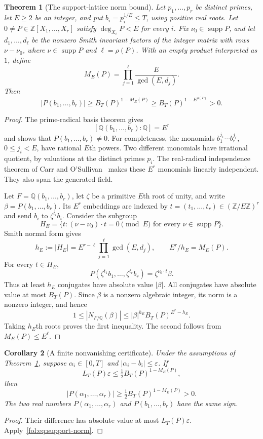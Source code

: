 \documentclass[11pt,a4paper]{article}
\newtheorem{theorem}{Theorem}[section]
\newtheorem{corollary}[theorem]{Corollary}
\theoremstyle{definition}
\theoremstyle{remark}
\numberwithin{equation}{section}
\begin{document}
\begin{theorem}[The support-lattice norm bound]
\label{fol:thm:support-norm}
Let $p_1,\ldots,p_r$ be distinct primes, let $E\ge2$ be an integer, and
put $b_i=p_i^{1/E}\le T$, using positive real roots. Let
$0\ne P\in\mathbb Z[X_1,\ldots,X_r]$ satisfy
$\deg_{X_i}P<E$ for every $i$. Fix $\nu_0\in\operatorname{supp}P$, and
let $d_1,\ldots,d_\ell$ be the nonzero Smith invariant factors of the
integer matrix with rows $\nu-\nu_0$, where
$\nu\in\operatorname{supp}P$ and $\ell=\rho(P)$. With an empty product
interpreted as $1$, define
\[
 M_E(P)=\prod_{j=1}^{\ell}\frac{E}{\gcd(E,d_j)}.
\]
Then
\begin{equation}\label{fol:eq:support-norm}
 |P(b_1,\ldots,b_r)|\ge B_T(P)^{1-M_E(P)}
 \ge B_T(P)^{1-E^{\rho(P)}}>0.
\end{equation}
\end{theorem}

\begin{proof}
The prime-radical basis theorem gives
\[
 [\mathbb Q(b_1,\ldots,b_r):\mathbb Q]=E^r
\]
and shows that $P(b_1,\ldots,b_r)\ne0$. For completeness, the monomials
$b_1^{j_1}\cdots b_r^{j_r}$, $0\le j_i<E$, have rational $E$th powers.
Two different monomials have irrational quotient, by valuations at the
distinct primes $p_i$. The real-radical independence theorem of Carr and
O'Sullivan~\cite[Theorem~1.1]{CarrOSullivan2009} makes these $E^r$
monomials linearly independent. They also span the generated field.

Let $F=\mathbb Q(b_1,\ldots,b_r)$, let $\zeta$ be a primitive $E$th
root of unity, and write $\beta=P(b_1,\ldots,b_r)$. Its $E^r$ embeddings
are indexed by $t=(t_1,\ldots,t_r)\in(\mathbb Z/E\mathbb Z)^r$ and send
$b_i$ to $\zeta^{t_i}b_i$. Consider the subgroup
\[
 H_E=\{t:(\nu-\nu_0)\cdot t=0\pmod E
                  \text{ for every }\nu\in\operatorname{supp}P\}.
\]
Smith normal form gives
\[
 h_E:=|H_E|=E^{r-\ell}\prod_{j=1}^{\ell}\gcd(E,d_j),
 \qquad E^r/h_E=M_E(P).
\]
For every $t\in H_E$,
\[
 P(\zeta^{t_1}b_1,\ldots,\zeta^{t_r}b_r)
       =\zeta^{\nu_0\cdot t}\beta.
\]
Thus at least $h_E$ conjugates have absolute value $|\beta|$. All
conjugates have absolute value at most $B_T(P)$. Since $\beta$ is a
nonzero algebraic integer, its norm is a nonzero integer, and hence
\[
 1\le|N_{F/\mathbb Q}(\beta)|
 \le |\beta|^{h_E}B_T(P)^{E^r-h_E}.
\]
Taking $h_E$th roots proves the first inequality. The second follows
from $M_E(P)\le E^\ell$.
\end{proof}

\begin{corollary}[A finite nonvanishing certificate]
\label{fol:cor:support-certificate}
Under the assumptions of Theorem~\ref{fol:thm:support-norm}, suppose
$\alpha_i\in[0,T]$ and $|\alpha_i-b_i|\le\varepsilon$. If
\[
 L_T(P)\varepsilon\le\tfrac12 B_T(P)^{1-M_E(P)},
\]
then
\[
 |P(\alpha_1,\ldots,\alpha_r)|
 \ge\tfrac12 B_T(P)^{1-M_E(P)}>0.
\]
The two real numbers $P(\alpha_1,\ldots,\alpha_r)$ and
$P(b_1,\ldots,b_r)$ have the same sign.
\end{corollary}
\begin{proof}
Their difference has absolute value at most $L_T(P)\varepsilon$.
Apply~\eqref{fol:eq:support-norm}.
\end{proof}
\end{document}
